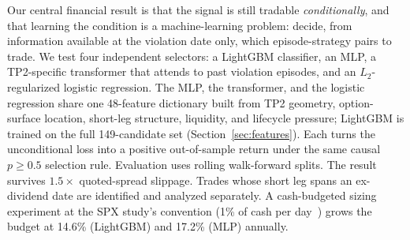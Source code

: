 \documentclass[sigconf,review,anonymous]{acmart}
\begin{document}
Our central financial result is that the signal is still tradable \emph{conditionally}, and that learning the condition is a machine-learning problem: decide, from information available at the violation date only, which episode-strategy pairs to trade. We test four independent selectors: a LightGBM classifier, an MLP, a TP2-specific transformer that attends to past violation episodes, and an $L_2$-regularized logistic regression. The MLP, the transformer, and the logistic regression share one 48-feature dictionary built from TP2 geometry, option-surface location, short-leg structure, liquidity, and lifecycle pressure; LightGBM is trained on the full 149-candidate set (Section~\ref{sec:features}). Each turns the unconditional loss into a positive out-of-sample return under the same causal $p\ge0.5$ selection rule. Evaluation uses rolling walk-forward splits. The result survives $1.5\times$ quoted-spread slippage. Trades whose short leg spans an ex-dividend date are identified and analyzed separately. A cash-budgeted sizing experiment at the SPX study's convention (1\% of cash per day~\cite{glasserman2025tp2}) grows the budget at 14.6\% (LightGBM) and 17.2\% (MLP) annually.
\end{document}
